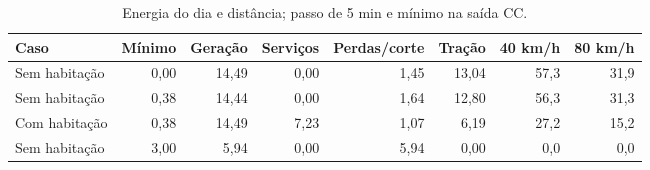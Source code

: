 \begin{table}[H]\centering\small
\caption{Energia do dia e distância; passo de 5 min e mínimo na saída CC.}\label{tab:i25}
\begin{tabularx}{\linewidth}{Xrrrrrrr}
\toprule
Caso & Mínimo & Geração & Serviços & Perdas/corte & Tração & 40 km/h & 80 km/h \\
\midrule
Sem habitação & 0,00 & 14,49 & 0,00 & 1,45 & 13,04 & 57,3 & 31,9 \\
Sem habitação & 0,38 & 14,44 & 0,00 & 1,64 & 12,80 & 56,3 & 31,3 \\
Com habitação & 0,38 & 14,49 & 7,23 & 1,07 & 6,19 & 27,2 & 15,2 \\
Sem habitação & 3,00 & 5,94 & 0,00 & 5,94 & 0,00 & 0,0 & 0,0 \\
\bottomrule
\end{tabularx}
\end{table}
